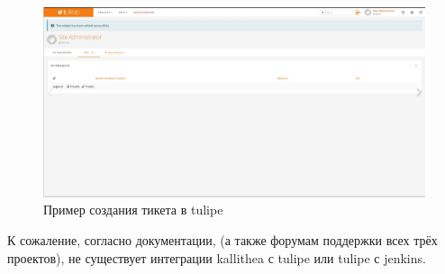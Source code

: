 \documentclass[a4paper]{extarticle}
\begin{document}
\begin{figure}[H]
\includegraphics[width=\textwidth,height=\textheight,keepaspectratio]{tulipe.png}
\caption{Пример создания тикета в tulipe}
\end{figure}

К сожаление, согласно документации, (а также  форумам поддержки всех трёх проектов), не существует интеграции kallithea с tulipe или tulipe с jenkins.
\end{document}
